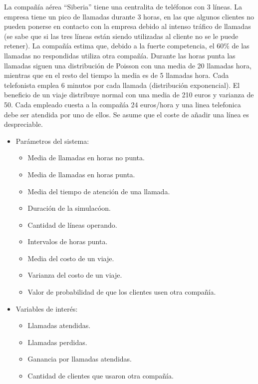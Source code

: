 \documentclass{article}
\begin{document}
		La compañía aérea “Siberia” tiene una centralita de teléfonos con 3 líneas. La empresa tiene un pico de llamadas durante 3 horas, en las que algunos clientes no pueden ponerse en contacto con la empresa debido al intenso tráfico de llamadas (se sabe que si las tres líneas están siendo utilizadas al cliente no se le puede retener). La compañía estima que, debido a la fuerte competencia, el 60\% de las	llamadas no respondidas utiliza otra compañía. Durante las horas punta las llamadas siguen una distribución de Poisson con una media de 20 llamadas hora, mientras que en el resto del tiempo la media es de 5 llamadas hora. Cada telefonista emplea 6 minutos por cada llamada (distribución exponencial). El beneficio de un viaje distribuye normal con una media de  210 euros y varianza de 50. Cada empleado cuesta a la compañía 24 euros/hora y una linea telefonica debe ser atendida por uno de ellos. Se asume que el coste de añadir una línea es despreciable.
		
		\begin{itemize}
			\item Parámetros del sistema:
				\begin{itemize}[left=2em]
					\item Media de llamadas en horas no punta.
					\item Media de llamadas en horas punta.
					\item Media del tiempo de atención de una llamada.
					\item Duración de la simulacóon.
					\item Cantidad de líneas operando.
					\item Intervalos de horas punta.
					\item Media del costo de un viaje.
					\item Varianza del costo de un viaje.
					\item Valor de probabilidad de que los clientes usen otra compañía.
				\end{itemize}
		
			\item Variables de interés:
				\begin{itemize}[left=2em]
					\item Llamadas atendidas.
					\item Llamadas perdidas.
					\item Ganancia por llamadas atendidas.
					\item Cantidad de clientes que usaron otra compañía.
				\end{itemize}
		\end{itemize}
	
\end{document}
